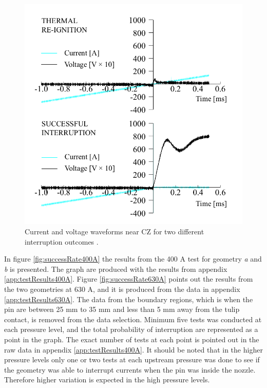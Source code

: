 \documentclass[10pt,a4paper,twoside]{article}
\begin{document}
\begin{figure}[H]
\centering
\includegraphics[scale=0.28]{Bilder/Results/differentInterruptions.png}
\caption{Current and voltage waveforms near CZ for two different interruption outcomes \cite{bib:AFIMVLBA}.} \label{fig:CurrentAndVoltageWaveform}
\end{figure}

In figure \ref{fig:successRate400A} the results from the 400 A test for geometry \textit{a} and \textit{b} is presented. The graph are produced with the results from appendix \ref{app:testResults400A}. Figure \ref{fig:successRate630A} points out the results from the two geometries at 630 A, and it is produced from the data in appendix \ref{app:testResults630A}. The data from the boundary regions, which is when the pin are between 25 mm to 35 mm and less than 5 mm away from the tulip contact, is removed from the data selection. Minimum five tests was conducted at each pressure level, and the total probability of interruption are represented as a point in the graph. The exact number of tests at each point is pointed out in the raw data in appendix \ref{app:testResults400A}. It should be noted that in the higher pressure levels only one or two tests at each upstream pressure was done to see if the geometry was able to interrupt currents when the pin was inside the nozzle. Therefore higher variation is expected in the high pressure levels.  
\end{document}
